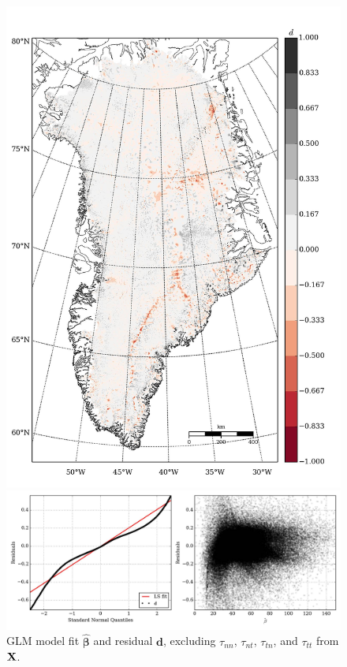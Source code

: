 \begin{figure}
\begin{minipage}[b]{0.47\linewidth}
    \includegraphics[width=1.0\textwidth]{images/greenland/stats/GLM_resid_no_membrane_stress.jpg}
  \end{minipage}
  \begin{minipage}[b]{0.99\linewidth}
    \includegraphics[width=1.0\textwidth]{images/greenland/stats/GLM_resid-NQ_no_membrane_stress.jpg}
  \end{minipage}
  \caption[]{GLM model fit $\bm{\hat{\beta}}$ and residual $\mathbf{d}$, excluding $\tau_{nn}$, $\tau_{nt}$, $\tau_{tn}$, and $\tau_{tt}$ from $\mathbf{X}$.}
\end{figure}

